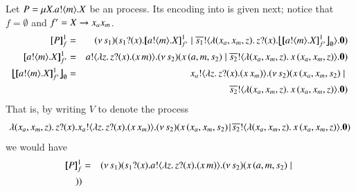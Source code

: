 \documentclass[runningheads]{llncs}
\begin{document}
{%
\begin{example}
Let $P = \mu X. a ! \langle m \rangle . X$ be an \HOp process.
Its encoding into \HO is given next; notice that $f = \emptyset$ and $f' = X \rightarrow x_ax_m$.
\begin{eqnarray*}
	\pmapp{P}{1}{f} &=&
	\newsp{s_1}{ \binp{s_1}{x} \pmapp{\bout{a}{m} \varp{X}}{1}{{f'}} \Par \bout{\dual{s_1}}{ \abs{(x_a, x_m, z)} \binp{z}{x} \auxmapp{\pmapp{\bout{a}{m} \varp{X}}{1}{{f'}}}{{}}{\es} } \inact} \\
\pmapp{\bout{a}{m} \varp{X}}{1}{{ f'}} &=&
	\bout{a}{\abs{z}{\binp{z}{x} (\appl{x}{m})}} \newsp{s_2}{\appl{x}{(a,m, s_2)}  \Par \bout{\dual{s_2}}{\abs{(x_a, x_m, z)}{\appl{x}{(x_a, x_m, z)}}} \inact} \\
	\auxmapp{\pmapp{\bout{a}{m} \varp{X}}{1}{{f'}}}{{}}{\es}
	  & = & 
	\bout{x_a}{\abs{z}{\binp{z}{x} (\appl{x}{x_m})}} \newsp{s_2}{\appl{x}{(x_a,x_m, s_2)}  \Par \\
	& & \qquad \qquad \qquad \qquad \qquad \qquad \qquad \bout{\dual{s_2}}{\abs{(x_a, x_m, z)}{\appl{x}{(x_a, x_m, z)}}} \inact}
\end{eqnarray*}
That is, by writing $V$ to denote the process
$$
\lambda (x_a, x_m, z).\,z ? (x) . x_a ! \langle \lambda z.\,z ? (x) . (x\, {x_m}) \rangle . (\nu\, s_2)(x\, {(x_a,x_m, s_2)}  \!\;|\;\! \overline{s_2} ! \langle \lambda (x_a, x_m, z).\,x\, {(x_a, x_m, z)} \rangle . \mathbf{0})
$$
we would have %
\begin{eqnarray*}
[\!\![P]\!\!]^1_f & = & (\nu\, s_1)(s_1 ? (x) .  a ! \langle \lambda z.\,z ? (x) . (x\, {m}) \rangle . (\nu\, s_2)(x\, {(a,m, s_2)}  \;|\; \\
))
\end{eqnarray*}
\end{example}}
\end{document}
